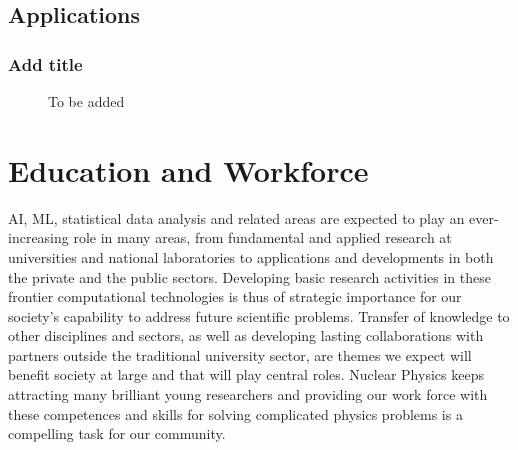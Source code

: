 \documentclass[%
10pt]{article}
\begin{document}
\clearpage\newpage


\subsection{Applications}
\subsubsection{Add title}
\vspace{5mm}
\noindent
{}
\begin{figure}[htb!]
\centering
\caption{To be added}
\end{figure}
\clearpage
\newpage



\section{Education and Workforce}

AI, ML, statistical data analysis and related areas are expected to
play an ever-increasing role in many areas, from fundamental and
applied research at universities and national laboratories to
applications and developments in both the private and the public
sectors.
Developing basic research activities in these frontier
computational technologies is thus of strategic importance for our
society’s capability to address future scientific problems. Transfer
of knowledge to other disciplines and sectors, as well as developing
lasting collaborations with partners outside the traditional
university sector, are themes we expect will benefit society at large
and that will play central roles. Nuclear Physics keeps attracting many brilliant young researchers and providing our work force with these competences and skills for solving complicated physics problems is a compelling task for our community.
\end{document}
